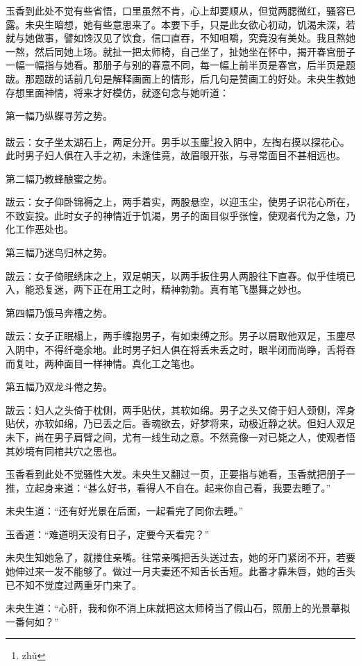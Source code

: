 \documentclass[a4paper,12pt,UTF8,twoside]{ctexbook}
\begin{document}
玉香到此处不觉有些省悟，口里虽然不肯，心上却要顺从，但觉两腮微红，骚容已露。未央生暗想，她有些意思来了。本要下手，只是此女欲心初动，饥渴未深，若就与她做事，譬如馋汉见了饮食，信口直吞，不知咀嚼，究竟没有美处。我且熬她一熬，然后同她上场。就扯一把太师椅，自己坐了，扯她坐在怀中，揭开春宫册子一幅一幅指与她看。那册子与别的春意不同，每一幅上前半页是春宫，后半页是题跋。那题跋的话前几句是解释画面上的情形，后几句是赞画工的好处。未央生教她存想里面神情，将来才好模仿，就逐句念与她听道：

第一幅乃纵蝶寻芳之势。

跋云：女子坐太湖石上，两足分开。男手以玉麈\footnote{zh\v{u}}投入阴中，左掏右摸以探花心。此时男子妇人俱在入手之初，未逢佳竟，故眉眼开张，与寻常面目不甚相远也。

第二幅乃教蜂酿蜜之势。

跋云：女子仰卧锦褥之上，两手着实，两股悬空，以迎玉尘，使男子识花心所在，不致妄投。此时女子的神情近于饥渴，男子的面目似乎张惶，使观者代为之急，乃化工作恶处也。

第三幅乃迷鸟归林之势。

跋云：女子倚眠绣床之上，双足朝天，以两手扳住男人两股往下直舂。似乎佳境已入，能恐复迷，两下正在用工之时，精神勃勃。真有笔飞墨舞之妙也。

第四幅乃饿马奔槽之势。

跋云：女子正眠榻上，两手缠抱男子，有如束缚之形。男子以肩取他双足，玉麈尽入阴中，不得纤毫余地。此时男子妇人俱在将丢未丢之时，眼半闭而尚睁，舌将吞而复吐，两种面目一样神情。真化工之笔也。

第五幅乃双龙斗倦之势。

跋云：妇人之头倚于枕侧，两手贴伏，其软如绵。男子之头又倚于妇人颈侧，浑身贴伏，亦软如绵，乃已丢之后。香魂欲去，好梦将来，动极近静之状。但妇人双足未下，尚在男子肩臂之间，尤有一线生动之意。不然竟像一对已毙之人，使观者悟其妙境有同棺共穴之思也。

玉香看到此处不觉骚性大发。未央生又翻过一页，正要指与她看，玉香就把册子一推，立起身来道：“甚么好书，看得人不自在。起来你自己看，我要去睡了。”

未央生道：“还有好光景在后面，一起看完了同你去睡。”

玉香道：“难道明天没有日子，定要今天看完？”

未央生知她急了，就搂住亲嘴。往常亲嘴把舌头送过去，她的牙门紧闭不开，若要她伸过来一发不能够了。做过一月夫妻还不知舌长舌短。此番才靠朱唇，她的舌头已不知不觉度过两重牙门来了。

未央生道：“心肝，我和你不消上床就把这太师椅当了假山石，照册上的光景摹拟一番何如？”
\end{document}

